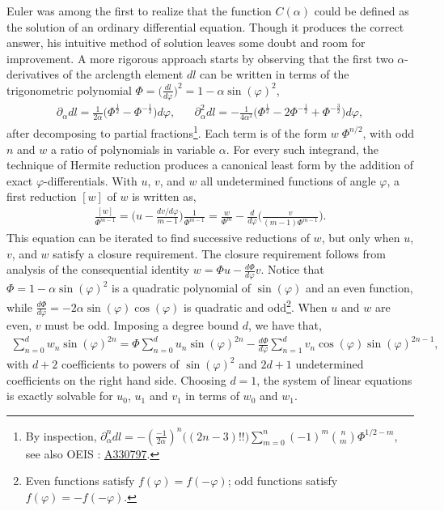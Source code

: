 \documentclass[nofootinbib,preprint]{revtex4-1}
\begin{document}
Euler was among the first to realize that the function $C(\alpha)$ could be defined as 
the solution of an ordinary differential equation. Though it produces the correct
answer, his intuitive method of solution leaves some doubt and room for improvement. 
A more rigorous approach starts by observing that the first two $\alpha$-derivatives of 
the arclength element $dl$ can be written in terms of the trigonometric polynomial 
$\Phi = \big(\frac{dl}{d\varphi}\big)^2 = 1-\alpha \sin(\varphi)^2$,
\begin{eqnarray}
\partial_{\alpha} dl = \frac{1}{2\alpha}\bigg(\Phi^{\frac{1}{2}} - \Phi^{-\frac{1}{2}} \bigg)d\varphi,
 \;\;\;\;\;\;
\partial_{\alpha}^2 dl = -\frac{1}{4\alpha^2}\bigg(\Phi^{\frac{1}{2}}
- 2\Phi^{-\frac{1}{2}} + \Phi^{-\frac{3}{2}} \bigg)d\varphi, 
 \nonumber
\end{eqnarray}
after decomposing to partial fractions\footnote{By inspection, 
$\partial_{\alpha}^n dl= -(\tfrac{-1}{2\alpha})^n \big( (2n-3)!! \big)
\sum_{m=0}^n(-1)^m\binom{n}{m} \Phi^{1/2-m}$, see also OEIS 
\cite{SLOANE2019}: \href{https://oeis.org/A330797}{A330797}.}. Each term is of the 
form $w\;\Phi^{n/2}$, with odd $n$ and $w$ a ratio of polynomials in variable $\alpha$. 
For every such integrand, the technique of Hermite reduction produces a canonical least 
form by the addition of exact $\varphi$-differentials.  With $u$, $v$, and $w$ all undetermined 
functions of angle $\varphi$, a first reduction $[w]$ of $w$ is written as, 
\begin{eqnarray}
\frac{[w]}{\Phi^{m-1}}=\Big(u-\frac{dv/d\varphi}{m-1}\Big)\frac{1}{\Phi^{m-1}} = 
\frac{w}{\Phi^{m}}-\frac{d}{d\varphi}\bigg( \frac{v}{(m-1)\Phi^{m-1}}\bigg). \nonumber
\end{eqnarray}
This equation can be iterated to find successive reductions of $w$, but only when $u$,$v$, 
and $w$ satisfy a closure requirement. The closure requirement follows from analysis of the consequential 
identity $w=\Phi u - \frac{d\Phi}{d\varphi} v$. Notice that $\Phi=1-\alpha \sin(\varphi)^2$ 
is a quadratic polynomial of $\sin(\varphi)$ and an even function, while 
$\frac{d\Phi}{d\varphi}=-2 \alpha \sin(\varphi)\cos(\varphi)$ is quadratic and odd\footnote{ 
Even functions satisfy $f(\varphi)=f(-\varphi)$; odd functions satisfy $f(\varphi)=-f(-\varphi)$.}. When 
$u$ and $w$ are even, $v$ must be odd. Imposing a degree bound $d$, we have that,
\begin{eqnarray}
\sum_{n=0}^{d} w_n \sin(\varphi)^{2n} =  \Phi \sum_{n=0}^{d} u_n \sin(\varphi)^{2n}
-\frac{d\Phi}{d\varphi}\sum_{n=1}^{d} v_n \cos(\varphi)\sin(\varphi)^{2n-1}, \nonumber
\end{eqnarray}
with $d+2$ coefficients to powers of $\sin(\varphi)^2$ and $2d+1$ undetermined 
coefficients on the right hand side. Choosing $d=1$, the system of linear equations
is exactly solvable for $u_0$, $u_1$ and $v_1$ in terms of $w_0$ and $w_1$.
\end{document}
